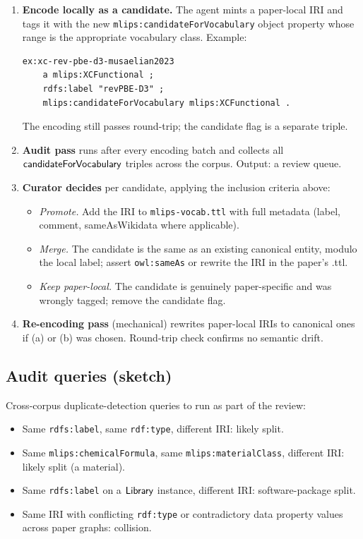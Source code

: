 \begin{enumerate}
\item \textbf{Encode locally as a candidate.} The agent mints a
  paper-local IRI and tags it with the new
  \texttt{mlips:candidateForVocabulary} object property whose
  range is the appropriate vocabulary class. Example:
\begin{lstlisting}[language=turtle]
ex:xc-rev-pbe-d3-musaelian2023
    a mlips:XCFunctional ;
    rdfs:label "revPBE-D3" ;
    mlips:candidateForVocabulary mlips:XCFunctional .
\end{lstlisting}
  The encoding still passes round-trip; the candidate flag is a
  separate triple.

\item \textbf{Audit pass} runs after every encoding batch and
  collects all $\mathsf{candidateForVocabulary}$ triples across
  the corpus. Output: a review queue.

\item \textbf{Curator decides} per candidate, applying the
  inclusion criteria above:
  \begin{itemize}
  \item \emph{Promote.} Add the IRI to \texttt{mlips-vocab.ttl}
    with full metadata (label, comment, sameAsWikidata where
    applicable).
  \item \emph{Merge.} The candidate is the same as an existing
    canonical entity, modulo the local label; assert
    \texttt{owl:sameAs} or rewrite the IRI in the paper's .ttl.
  \item \emph{Keep paper-local.} The candidate is genuinely
    paper-specific and was wrongly tagged; remove the
    candidate flag.
  \end{itemize}

\item \textbf{Re-encoding pass} (mechanical) rewrites paper-local
  IRIs to canonical ones if (a) or (b) was chosen. Round-trip
  check confirms no semantic drift.
\end{enumerate}

\subsection{Audit queries (sketch)}

Cross-corpus duplicate-detection queries to run as part of the
review:

\begin{itemize}
\item Same \texttt{rdfs:label}, same \texttt{rdf:type}, different
  IRI: likely split.
\item Same \texttt{mlips:chemicalFormula}, same
  \texttt{mlips:materialClass}, different IRI: likely split (a
  material).
\item Same \texttt{rdfs:label} on a $\mathsf{Library}$ instance,
  different IRI: software-package split.
\item Same IRI with conflicting \texttt{rdf:type} or
  contradictory data property values across paper graphs:
  collision.
\end{itemize}


